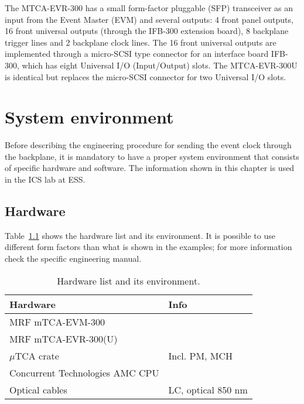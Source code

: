 \documentclass[11pt
  , a4paper
  , article
  , oneside
  , showtrims
]{memoir}
\begin{document}
The MTCA-EVR-300 has a small form-factor pluggable (SFP) transceiver as an input from the Event Master (EVM) and several outputs: 4 front panel outputs, 16 front universal outputs (through the IFB-300 extension board), 8 backplane trigger lines and 2 backplane clock lines. The 16 front universal outputs are implemented through a micro-SCSI type connector for an interface board IFB-300, which has eight Universal I/O (Input/Output) slots. The MTCA-EVR-300U is identical but replaces the micro-SCSI connector for two Universal I/O slots.\\


\chapter{System environment}
Before describing the engineering procedure for sending the event clock through the backplane, it is mandatory to have a proper system environment that consists of specific hardware and software. The information shown in this chapter is used in the ICS lab at ESS.\\


\section{Hardware}
Table~\ref{table:hwlist} shows the hardware list and its environment. It is possible to use different form factors than what is shown in the examples; for more information check the specific engineering manual.\\

\begin{table}[!hb]
  \centering
    \begin{tabular}{l|l}
      \toprule
      Hardware                        & Info               \\\midrule
      MRF mTCA-EVM-300                &                    \\\midrule
      MRF mTCA-EVR-300(U)             &                    \\\midrule
      $\mu$TCA crate                  & Incl. PM, MCH      \\\midrule
      Concurrent Technologies AMC CPU &                    \\\midrule
      Optical cables                  & LC, optical 850 nm \\\bottomrule
  \end{tabular}
  \caption[]{Hardware list and its environment.}
  \label{table:hwlist}
\end{table}
\end{document}

